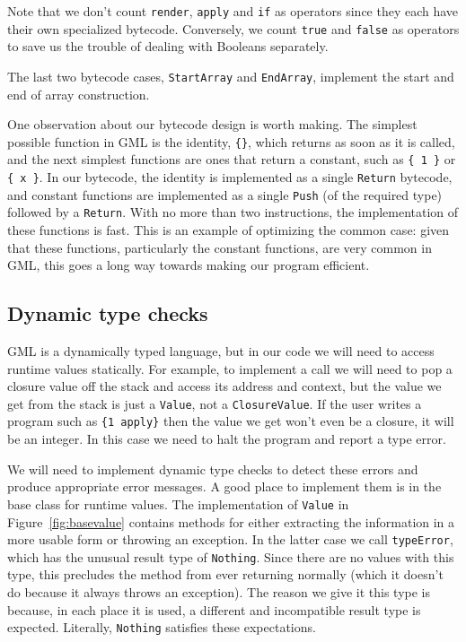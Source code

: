 Note that we don't count
\verb!render!, \verb!apply! and \verb!if! as operators
since they each have their own specialized bytecode.
Conversely,
we count \verb!true! and \verb!false! as operators
to save us the trouble of dealing with Booleans separately.

The last two bytecode cases, \verb!StartArray! and \verb!EndArray!,
implement the start and end of array construction.

One observation about our bytecode design is worth making.
The simplest possible function in GML is the identity, \verb!{}!,
which returns as soon as it is called,
and the next simplest functions are ones that return a constant,
such as \verb!{ 1 }! or \verb!{ x }!.
In our bytecode,
the identity is implemented as a single \verb!Return! bytecode,
and constant functions are implemented as a single \verb!Push!
(of the required type) followed by a \verb!Return!.
With no more than two instructions,
the implementation of these functions is fast.
This is an example of optimizing the common case:
given that these functions, particularly the constant functions,
are very common in GML,
this goes a long way towards making our program efficient.

\subsection{Dynamic type checks\label{sec:dynamic}}

GML is a dynamically typed language,
but in our code we will need to access runtime values statically.
For example,
to implement a call we will need to pop a closure value off the stack
and access its address and context,
but the value we get from the stack is just a \verb!Value!,
not a \verb!ClosureValue!.
If the user writes a program such as \verb!{1 apply}!
then the value we get won't even be a closure,
it will be an integer.
In this case we need to halt the program and report a type error.

We will need to implement dynamic type checks to detect these errors
and produce appropriate error messages.
A good place to implement them is in the base class for runtime values.
The implementation of \verb!Value! in Figure~\ref{fig:basevalue}
contains methods for either extracting the information in a more usable form
or throwing an exception.
In the latter case we call \verb!typeError!,
which has the unusual result type of \verb!Nothing!.
Since there are no values with this type,
this precludes the method from ever returning normally
(which it doesn't do because it always throws an exception).
The reason we give it this type is because, in each place it is used,
a different and incompatible result type is expected.
Literally, \verb!Nothing! satisfies these expectations.

